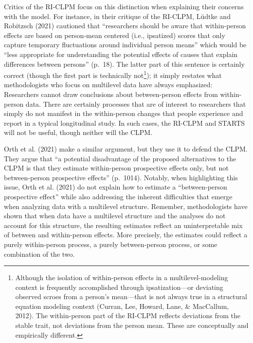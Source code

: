 \documentclass[
  english,
  man,floatsintext]{apa6}
\begin{document}
Critics of the RI-CLPM focus on this distinction when explaining their concerns with the model. For instance, in their critique of the RI-CLPM, Lüdtke and Robitzsch (2021) cautioned that ``researchers should be aware that within-person effects are based on person-mean centered (i.e., ipsatized) scores that only capture temporary fluctuations around individual person means'' which would be ``less appropriate for understanding the potential effects of causes that explain differences between persons'' (p.~18). The latter part of this sentence is certainly correct (though the first part is technically not\footnote{Although the isolation of within-person effects in a multilevel-modeling context is frequently accomplished through ipsatization---or deviating observed scroes from a person's mean---that is not always true in a structural equation modeling context (Curran, Lee, Howard, Lane, \& MacCallum, 2012). The within-person part of the RI-CLPM reflects deviations from the stable trait, not deviations from the person mean. These are conceptually and empirically different.}); it simply restates what methodologists who focus on multilevel data have always emphasized: Researchers cannot draw conclusions about between-person effects from within-person data. There are certainly processes that are of interest to researchers that simply do not manifest in the within-person changes that people experience and report in a typical longitudinal study. In such cases, the RI-CLPM and STARTS will not be useful, though neither will the CLPM.

Orth et al. (2021) make a similar argument, but they use it to defend the CLPM. They argue that ``a potential disadvantage of the proposed alternatives to the CLPM is that they estimate within-person prospective effects only, but not between-person prospective effects'' (p.~1014). Notably, when highlighting this issue, Orth et al. (2021) do not explain how to estimate a ``between-person prospective effect'' while also addressing the inherent difficulties that emerge when analyzing data with a multilevel structure. Remember, methodologists have shown that when data have a multilevel structure and the analyses do not account for this structure, the resulting estimates reflect an uninterpretable mix of between and within-person effects. More precisely, the estimates could reflect a purely within-person process, a purely between-person process, or some combination of the two.
\end{document}

